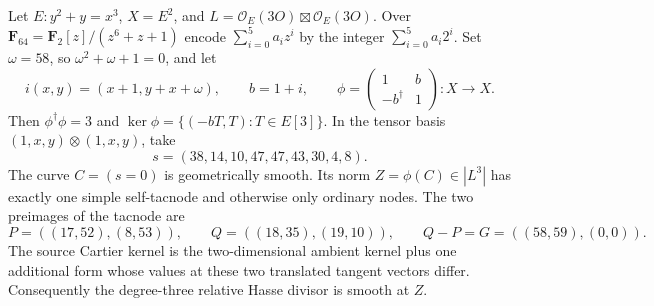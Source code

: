 \begin{lemma}
\label{lem:ss-global-contact03}
Let $E:y^2+y=x^3$, $X=E^2$, and
$L=\mathcal O_E(3O)\boxtimes\mathcal O_E(3O)$.
Over $\mathbf F_{64}=\mathbf F_2[z]/(z^6+z+1)$ encode
$\sum_{i=0}^5a_i z^i$ by the integer $\sum_{i=0}^5a_i2^i$.
Set $\omega=58$, so $\omega^2+\omega+1=0$, and let
\[
 i(x,y)=(x+1,y+x+\omega),\qquad b=1+i,\qquad
 \phi=\begin{pmatrix}1&b\\-b^\dagger&1\end{pmatrix}:X\to X.
\]
Then $\phi^\dagger\phi=3$ and $\ker\phi=\{(-bT,T):T\in E[3]\}$.
In the tensor basis $(1,x,y)\otimes(1,x,y)$, take
\[
 s=(38,14,10,47,47,43,30,4,8).
\]
The curve $C=(s=0)$ is geometrically smooth. Its norm
$Z=\phi(C)\in|L^3|$ has exactly one simple self-tacnode and otherwise
only ordinary nodes. The two preimages of the tacnode are
\[
 P=((17,52),(8,53)),\qquad Q=((18,35),(19,10)),
 \qquad Q-P=G=((58,59),(0,0)).
\]
The source Cartier kernel is the two-dimensional ambient kernel plus
one additional form whose values at these two translated tangent
vectors differ. Consequently the degree-three relative Hasse divisor
is smooth at $Z$.
\end{lemma}

